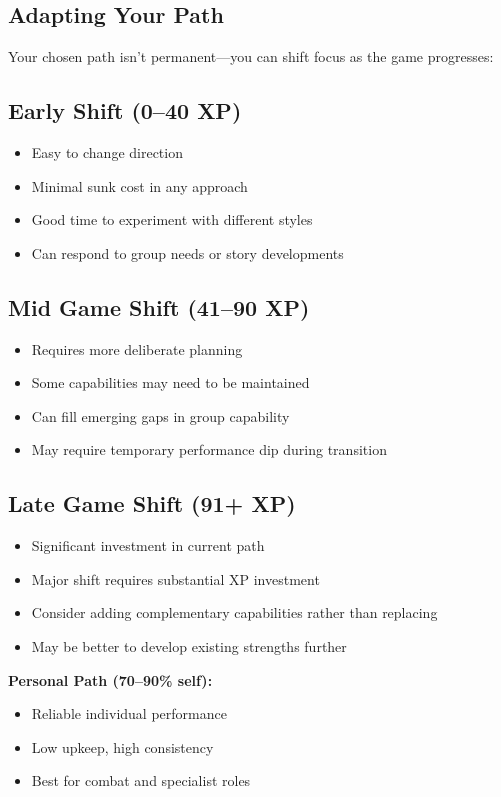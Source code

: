 \begin{multicols}{2}
\section{Adapting Your Path}

Your chosen path isn't permanent—you can shift focus as the game progresses:

\subsection*{Early Shift (0--40 XP)}
\begin{itemize}
\item Easy to change direction
\item Minimal sunk cost in any approach
\item Good time to experiment with different styles
\item Can respond to group needs or story developments
\end{itemize}

\subsection*{Mid Game Shift (41--90 XP)}
\begin{itemize}
\item Requires more deliberate planning
\item Some capabilities may need to be maintained
\item Can fill emerging gaps in group capability
\item May require temporary performance dip during transition
\end{itemize}

\subsection*{Late Game Shift (91+ XP)}
\begin{itemize}
\item Significant investment in current path
\item Major shift requires substantial XP investment
\item Consider adding complementary capabilities rather than replacing
\item May be better to develop existing strengths further
\end{itemize}

\begin{tcolorbox}[colback=green!5!white,colframe=green!75!black,title=XP Path Quick Reference,fonttitle=\bfseries]
\textbf{Personal Path (70--90\% self):}
\begin{itemize}
\item Reliable individual performance
\item Low upkeep, high consistency
\item Best for combat and specialist roles
\end{itemize}


\end{tcolorbox}
\end{multicols}
